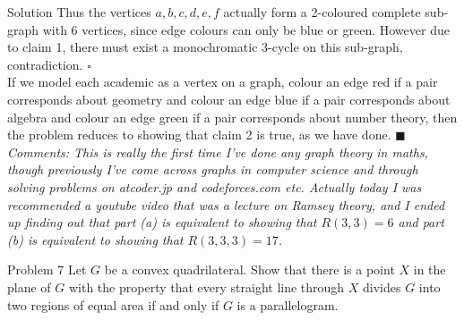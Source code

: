 \documentclass{article}
\begin{document}
\begin{solution}{Solution}
Thus the vertices $a,b,c,d,e,f$ actually form a 2-coloured complete
sub-graph with 6 vertices, since edge colours can only be blue or green.
However due to claim 1, there must exist a monochromatic 3-cycle on this
sub-graph, contradiction. $\square$\\

If we model each academic as a vertex on a graph, colour an edge red
if a pair corresponds about geometry and colour an edge blue if a pair
corresponds about algebra and colour an edge green if a pair corresponds
about number theory, then the problem reduces to showing that claim 2
is true, as we have done. $\blacksquare$
\\

\textit{Comments: This is really the first time I've done any graph theory
in maths, though previously I've come across graphs in computer science
and through solving problems on atcoder.jp and codeforces.com etc. Actually
today I was recommended a youtube video that was a lecture on Ramsey
theory, and
I ended up finding out that part (a) is equivalent to showing that
$R(3,3) = 6$ and part (b) is equivalent to showing that $R(3,3,3)=17$.}
\end{solution}
\newpage

\begin{problem}{Problem 7}
Let $G$ be a convex quadrilateral. Show that there is a point $X$ in the
plane of $G$ with the property that every straight line through $X$ divides
$G$ into two regions of equal area if and only if $G$ is a parallelogram.
\end{problem}
\end{document}

